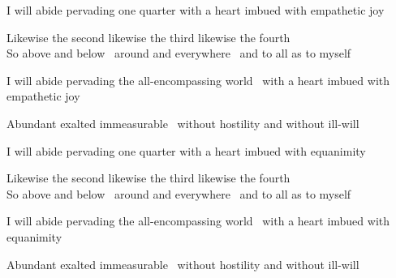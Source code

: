 \medskip

\begin{english-hang}
  I will abide pervading one quarter with a heart imbued with empathetic joy\makeatletter\hyperlink{endnote97-appendix}\makeatother
\end{english-hang}

\begin{english}
  Likewise the second likewise the third likewise the fourth\\
  So above and below \breathmark\ around and everywhere \breathmark\ and to all as to myself
\end{english}

\begin{english-hang}
  I will abide pervading the all-encompassing world \breathmark\ with a heart imbued with empathetic joy
\end{english-hang}

\begin{english-hang}
  Abundant exalted immeasurable \breathmark\ without hostility and without ill-will
\end{english-hang}

\smallskip

\begin{english-hang}
  I will abide pervading one quarter with a heart imbued with equanimity
\end{english-hang}

\begin{english}
  Likewise the second likewise the third likewise the fourth\\
  So above and below \breathmark\ around and everywhere \breathmark\ and to all as to myself
\end{english}

\begin{english-hang}
  I will abide pervading the all-encompassing world \breathmark\ with a heart imbued with equanimity
\end{english-hang}

\begin{english-hang}
  Abundant exalted immeasurable \breathmark\ without hostility and without ill-will
\end{english-hang}

\suttaRef{[DN 13]}


